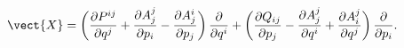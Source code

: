 \begin{equation}
  \vect{X} = \bigg(\frac{\partial P^{ij}}{\partial q^j}
  + \frac{\partial A^j_j}{\partial p_i} - \frac{\partial A^i_j}{\partial p_j}
  \bigg)\,\frac{\partial}{\partial q^i}
  + \bigg(\frac{\partial Q_{ij}}{\partial p_j}
  - \frac{\partial A^j_j}{\partial q^i}
  + \frac{\partial A^j_i}{\partial q^j}\bigg)\,
  \frac{\partial}{\partial p_i}.
\label{XH}
\end{equation}

